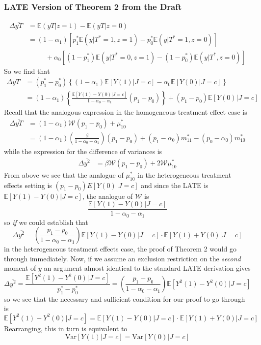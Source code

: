 \documentclass[12pt]{article}
\begin{document}
\subsubsection{LATE Version of Theorem 2 from the Draft}
\begin{align*}
  \Delta\overline{yT} &= \mathbb{E}\left( yT|z=1 \right) - \mathbb{E}\left( yT|z=0 \right) \\
  &= (1 - \alpha_1) \left[ p_1^* \mathbb{E}\left( y|T^*=1, z=1 \right) - p_0^* \mathbb{E}\left(y|T^*=1, z=0\right) \right] \\
  & \; \; \quad \quad + \alpha_0 \left[ (1 - p_1^*)\mathbb{E}\left( y|T^*=0, z=1\right) - (1 - p_0^*)\mathbb{E}\left(y|T^*,z=0 \right) \right]
\end{align*}
So we find that
\begin{align*}
  \Delta\overline{yT} &= (p_1^* - p_0^*)\left\{ (1 - \alpha_1) \mathbb{E}\left[ Y(1)|J=c \right] - \alpha_0\mathbb{E}\left[ Y(0)|J=c \right] \right\}\\
  &= (1 - \alpha_1) \left\{ \frac{\mathbb{E}\left[ Y(1) - Y(0)|J=c \right]}{1 - \alpha_0 - \alpha_1} (p_1 - p_0) \right\} + (p_1  - p_0) \mathbb{E}\left[ Y(0)|J=c \right]
\end{align*}
Recall that the analogous expression in the homogeneous treatment effect case is
\begin{align*}
  \Delta\overline{yT} &= (1 - \alpha_1) \mathcal{W} (p_1 - p_0) + \mu_{10}^*\\
  &= (1 - \alpha_1) \left(\frac{\beta}{1 - \alpha_0 - \alpha_1}\right) (p_1 - p_0) + (p_1 - \alpha_0)m_{11}^* - (p_0 - \alpha_0)m_{10}^*
\end{align*}
while the expression for the difference of variances is 
\begin{align*}
  \Delta\overline{y^2} &= \beta \mathcal{W}(p_1 - p_0) + 2\mathcal{W} \mu_{10}^*
\end{align*}
From above we see that the analogue of $\mu_{10}^*$ in the heterogeneous treatment effects setting is $(p_1 - p_0)E\left[ Y(0)|J=c \right]$ and since the LATE is $\mathbb{E}\left[ Y(1) - Y(0) |J=c\right]$, the analogue of $\mathcal{W}$ is
\[
  \frac{\mathbb{E}\left[ Y(1) - Y(0)|J=c \right]}{1 - \alpha_0 - \alpha_1}
\]
so \emph{if} we could establish that 
\[
  \Delta\overline{y^2} =  \left( \frac{p_1 - p_0}{1 - \alpha_0 - \alpha_1} \right)\mathbb{E}\left[ Y(1) - Y(0)|J=c \right]\cdot \mathbb{E}\left[ Y(1) + Y(0) |J=c \right]
\]
in the heterogeneous treatment effects case, the proof of Theorem 2 would go through immediately.
Now, if we assume an exclusion restriction on the \emph{second} moment of $y$ an argument almost identical to the standard LATE derivation gives
\[
  \Delta\overline{y^2} = \frac{\mathbb{E}\left[ Y^2(1) - Y^2(0) |J=c \right]}{p_1^* - p_0^*} = \left( \frac{p_1 - p_0}{1 - \alpha_0 - \alpha_1} \right)\mathbb{E}\left[ Y^2(1) - Y^2(0) |J=c \right] 
\]
so we see that the necessary and sufficient condition for our proof to go through is 
\[
  \mathbb{E}\left[ Y^2(1) - Y^2(0)|J=c \right] = \mathbb{E}\left[ Y(1) - Y(0)|J=c \right]\cdot \mathbb{E}\left[ Y(1) + Y(0)|J=c \right]
\]
Rearranging, this in turn is equivalent to
\[
  \mbox{Var}\left[ Y(1)|J=c \right] = \mbox{Var}\left[ Y(0)|J=c \right]
\]
\end{document}
